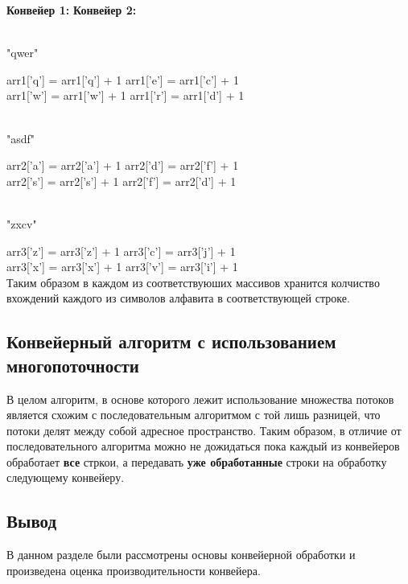 \documentclass[12pt,a4paper]{article}
\numberwithin{equation}{section}
\begin{document}
\textbf{Конвейер 1:} \qquad\qquad\qquad\qquad\qquad\qquad\qquad\qquad\qquad\qquad \textbf{Конвейер 2:}  \\\\
\begin{center}
	"qwer"\\
\end{center}
arr1['q'] = arr1['q'] + 1 \qquad\qquad\qquad\qquad\qquad\qquad\qquad\qquad arr1['e'] = arr1['c'] + 1\\
arr1['w'] = arr1['w'] + 1 \qquad\qquad\qquad\qquad\qquad\qquad\qquad\qquad
arr1['r'] = arr1['d'] + 1\\\\

\begin{center}
	"asdf"\\
\end{center}
arr2['a'] = arr2['a'] + 1 \qquad\qquad\qquad\qquad\qquad\qquad\qquad\qquad
arr2['d'] = arr2['f'] + 1\\
arr2['s'] = arr2['s'] + 1 \qquad\qquad\qquad\qquad\qquad\qquad\qquad\qquad
arr2['f'] = arr2['d'] + 1\\\\

\begin{center}
	"zxcv"\\
\end{center}
arr3['z'] = arr3['z'] + 1 \qquad\qquad\qquad\qquad\qquad\qquad\qquad\qquad
arr3['c'] = arr3['j'] + 1 \\
arr3['x'] = arr3['x'] + 1 \qquad\qquad\qquad\qquad\qquad\qquad\qquad\qquad
arr3['v'] = arr3['i'] + 1\\

Таким образом в каждом из соответствуюших массивов хранится колчиство вхождений каждого из символов алфавита в соответствующей строке.

\subsection{Конвейерный алгоритм с использованием многопоточности}
В целом алгоритм, в основе которого лежит использование множества потоков является схожим с последовательным алгоритмом с той лишь разницей, что потоки делят между собой адресное пространство. Таким образом, в отличие от последовательного алгоритма можно не дожидаться пока каждый из конвейеров обработает \textbf{все} стркои, а передавать \textbf{уже обработанные} строки на обработку следующему конвейеру.

\subsection{Вывод}
В данном разделе были рассмотрены основы конвейерной обработки и произведена оценка
производительности конвейера.
\clearpage
\end{document}
